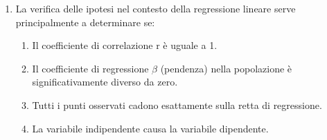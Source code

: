 \documentclass[12pt, a4paper]{article}
\begin{document}
\begin{enumerate}[resume]
    \item La verifica delle ipotesi nel contesto della regressione lineare serve principalmente a determinare se:
    \begin{enumerate}
        \item Il coefficiente di correlazione r è uguale a 1.
        \item Il coefficiente di regressione $\beta$ (pendenza) nella popolazione è significativamente diverso da zero.
        \item Tutti i punti osservati cadono esattamente sulla retta di regressione.
        \item La variabile indipendente causa la variabile dipendente.
    \end{enumerate}
    \vspace{0.3cm}
\end{enumerate}

\end{document}
